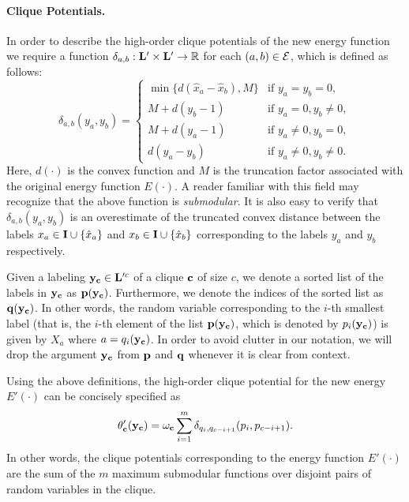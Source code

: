 \documentclass[10pt,letterpaper]{article}
\begin{document}
\paragraph{Clique Potentials.} In order to describe the high-order clique potentials of the new energy function
we require a function $\delta_{a,b}: {\bf L}' \times {\bf L}' \rightarrow \mathbb{R}$ for each $(a,b) \in {\cal E}$, which
is defined as follows:
\begin{equation}
\delta_{a,b}(y_a,y_b) = \left\{
\begin{array}{cl}
\min\{d(\hat{x}_a-\hat{x}_b),M\} & \mbox{if } y_a = y_b = 0, \\
M+d(y_b-1) & \mbox{if } y_a = 0, y_b \neq 0, \\
M+d(y_a-1) & \mbox{if } y_a \neq 0, y_b = 0, \\
d(y_a-y_b) & \mbox{if } y_a \neq 0, y_b \neq 0.
\end{array}
\right.
\label{eq:submodOverestimate}
\end{equation}
Here, $d(\cdot)$ is the convex function and $M$ is the truncation factor associated with the original energy function
$E(\cdot)$. A reader familiar with this field may recognize that the above function is {\em submodular}. It is
also easy to verify that $\delta_{a,b}(y_a,y_b)$ is an overestimate of the truncated convex distance between the
labels $x_a \in {\bf I} \cup \{\hat{x}_a\}$ and $x_b \in {\bf I} \cup \{\hat{x}_b\}$ corresponding to the labels
$y_a$ and $y_b$ respectively.

Given a labeling ${\bf y}_{\bf c} \in {\bf L}'^c$ of a clique ${\bf c}$ of size $c$, we denote a sorted list
of the labels in ${\bf y}_{\bf c}$ as ${\bf p}({\bf y}_{\bf c})$. Furthermore, we denote the indices of the sorted list as
${\bf q}({\bf y}_{\bf c})$. In other words, the random variable corresponding to the $i$-th smallest label (that is, the
$i$-th element of the list ${\bf p}({\bf y}_{\bf c})$, which is denoted by $p_i({\bf y}_{\bf c})$)
is given by $X_a$ where $a = q_i({\bf y}_{\bf c})$. In order to avoid clutter in our notation, we will drop the argument
${\bf y}_{\bf c}$ from ${\bf p}$ and ${\bf q}$ whenever it is clear from context.

Using the above definitions, the high-order clique potential for the new energy $E'(\cdot)$ can be concisely
specified as
\begin{equation}
\theta'_{\bf c}({\bf y}_{\bf c}) = \omega_{\bf c} \sum_{i=1}^m \delta_{q_i,q_{c-i+1}}(p_i,p_{c-i+1}).
\end{equation}
In other words, the clique potentials corresponding to the energy function $E'(\cdot)$ are the sum of the
$m$ maximum submodular functions over disjoint pairs of random variables in the clique.
\end{document}
